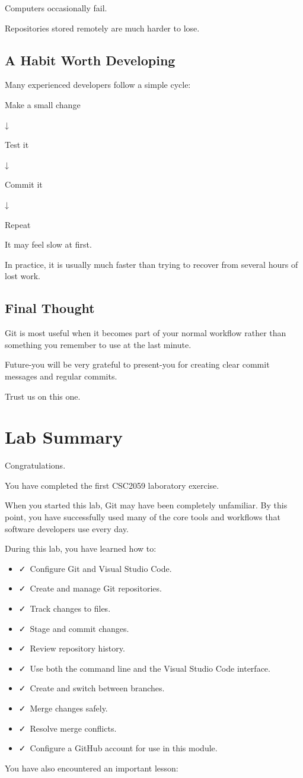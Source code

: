 \documentclass{csc2059practical}
\begin{document}
Computers occasionally fail.

Repositories stored remotely are much harder to lose.

\subsection{A Habit Worth Developing}
Many experienced developers follow a simple cycle:

Make a small change

↓

Test it

↓

Commit it

↓

Repeat

It may feel slow at first.

In practice, it is usually much faster than trying to recover from several hours of lost work.

\subsection{Final Thought}
Git is most useful when it becomes part of your normal workflow rather than something you remember to use at the last minute.

Future-you will be very grateful to present-you for creating clear commit messages and regular commits.

Trust us on this one.

\section{Lab Summary}
Congratulations.

You have completed the first CSC2059 laboratory exercise.

When you started this lab, Git may have been completely unfamiliar. By this point, you have successfully used many of the core tools and workflows that software developers use every day.

During this lab, you have learned how to:

\begin{itemize}
  \item \faCheck\ Configure Git and Visual Studio Code.
  \item \faCheck\ Create and manage Git repositories.
  \item \faCheck\ Track changes to files.
  \item \faCheck\ Stage and commit changes.
  \item \faCheck\ Review repository history.
  \item \faCheck\ Use both the command line and the Visual Studio Code interface.
  \item \faCheck\ Create and switch between branches.
  \item \faCheck\ Merge changes safely.
  \item \faCheck\ Resolve merge conflicts.
  \item \faCheck\ Configure a GitHub account for use in this module.
\end{itemize}
You have also encountered an important lesson:
\end{document}
